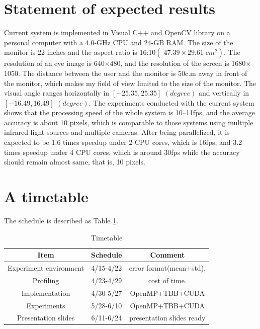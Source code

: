 \documentclass[sigconf]{acmart}
\begin{document}
\section{Statement of expected results}
Current system is implemented in Visual C++ and OpenCV library \cite{opencv_library} on a personal computer with a 4.0-GHz CPU and 24-GB RAM. The size of the monitor is 22 inches and the aspect ratio is 16:10$ \left(\;47.39\times29.61\; cm^2\right)$.
The resolution of an eye image is 640$\times$480, and the resolution of the screen is 1680$\times$1050.
The distance between the user and the monitor is 50c.m away in front of the monitor, which makes my field of view limited to the size of the monitor.
The visual angle ranges horizontally in $\left[-25.35 , 25.35\right]$ $\left(degree\right)$ and vertically in $\left[-16.49 , 16.49\right]$ $\left(degree\right)$. 
The experiments conducted with the current system shows that the processing speed of the whole system is 10--11fps, and the average accuracy is about 10 pixels, which is comparable to those systems using multiple infrared light sources and multiple cameras.
After being parallelized, it is expected to be 1.6 times speedup under 2 CPU cores, which is 16fps, and 3.2 times speedup under 4 CPU cores, which is around 30fps while the accuracy should remain almost same, that is, 10 pixels.


\section{A timetable}
The schedule is described as Table \ref{tab:schedule}.

\begin{table}[t]
\centering
\caption{Timetable}
\label{tab:schedule}
\begin{tabular}{ccc}
\hline
\hline
Item                & Schedule     & Comment\\
\hline
Experiment environment & 4/15-4/22  & error format(mean+std).     \\
Profiling              & 4/23-4/29  & cost of time. \\
Implementation         & 4/30-5/27  & OpenMP+TBB+CUDA \\
Experiments            & 5/28-6/10  & OpenMP+TBB+CUDA \\
Presentation slides    & 6/11-6/24  & presentation slides ready \\
\hline
\hline
\end{tabular}
\end{table}


%


\end{document}
